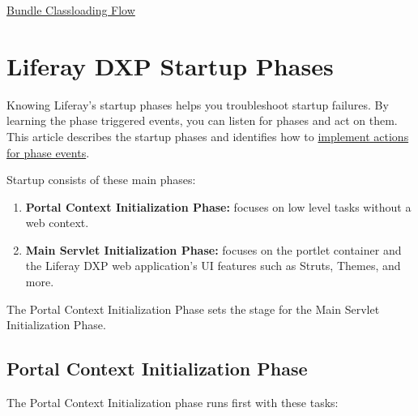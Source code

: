 \href{/docs/7-2/customization/-/knowledge_base/c/bundle-classloading-flow}{Bundle
Classloading Flow}

\chapter{Liferay DXP Startup Phases}\label{liferay-dxp-startup-phases}

Knowing Liferay's startup phases helps you troubleshoot startup
failures. By learning the phase triggered events, you can listen for
phases and act on them. This article describes the startup phases and
identifies how to \hyperref[acting-on-events]{implement actions for
phase events}.

Startup consists of these main phases:

\begin{enumerate}
\def\labelenumi{\arabic{enumi}.}
\item
  \textbf{Portal Context Initialization Phase:} focuses on low level
  tasks without a web context.
\item
  \textbf{Main Servlet Initialization Phase:} focuses on the portlet
  container and the Liferay DXP web application's UI features such as
  Struts, Themes, and more.
\end{enumerate}

The Portal Context Initialization Phase sets the stage for the Main
Servlet Initialization Phase.

\section{Portal Context Initialization
Phase}\label{portal-context-initialization-phase}

The Portal Context Initialization phase runs first with these tasks:

